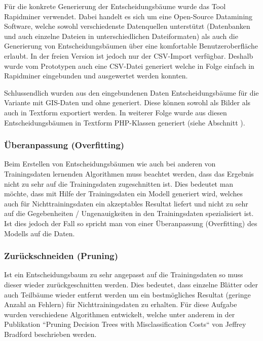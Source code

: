 Für die konkrete Generierung der Entscheidungsbäume wurde das Tool Rapidminer verwendet. Dabei handelt es sich um eine Open-Source Datamining Software, welche sowohl verschiedenste Datenquellen unterstützt (Datenbanken und auch einzelne Dateien in unterschiedlichen Dateiformaten) als auch die Generierung von Entscheidungsbäumen über eine komfortable Benutzeroberfläche erlaubt. In der freien Version ist jedoch nur der CSV-Import verfügbar. Deshalb wurde vom Prototypen auch eine CSV-Datei generiert welche in Folge einfach in Rapidminer eingebunden und ausgewertet werden konnten. 

Schlussendlich wurden aus den eingebundenen Daten Entscheidungsbäume für die Variante mit GIS-Daten und ohne generiert. Diese können sowohl als Bilder als auch in Textform exportiert werden. In weiterer Folge wurde aus diesen Entscheidungsbäumen in Textform PHP-Klassen generiert (siehe Abschnitt ).

\subsubsection{Überanpassung (Overfitting)}
Beim Erstellen von Entscheidungsbäumen wie auch bei anderen von Trainingsdaten lernenden Algorithmen muss beachtet werden, dass das Ergebnis nicht zu sehr auf die Trainingsdaten zugeschnitten ist. Dies bedeutet man möchte, dass mit Hilfe der Trainingsdaten ein Modell generiert wird, welches auch für Nichttrainingsdaten ein akzeptables Resultat liefert und nicht zu sehr auf die Gegebenheiten / Ungenauigkeiten in den Trainingsdaten spezialisiert ist. Ist dies jedoch der Fall so spricht man von einer Überanpassung (Overfitting) des Modells auf die Daten.  \cite{tom_dietterich_overfitting_1995}

\subsubsection{Zurückschneiden (Pruning)}
Ist ein Entscheidungsbaum zu sehr angepasst auf die Trainingsdaten so muss dieser wieder zurückgeschnitten werden. Dies bedeutet, dass einzelne Blätter oder auch Teilbäume wieder entfernt werden um ein bestmögliches Resultat (geringe Anzahl an Fehlern) für Nichttrainingsdaten zu erhalten. Für diese Aufgabe wurden verschiedene Algorithmen entwickelt, welche unter anderem in der Publikation ``Pruning Decision Trees with Misclassification Costs`` von Jeffrey Bradford beschrieben werden. \cite{jeffrey_p._bradford_pruning_1998}

